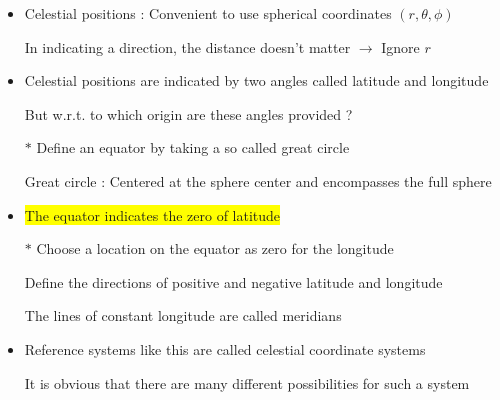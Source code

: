 \begin{itemize}
\item Celestial positions : Convenient to use spherical coordinates $(r,\theta,\phi)$
\item[] In indicating a direction, the distance doesn't matter $\rightarrow$ Ignore $r$
\item Celestial positions are indicated by two angles called {\blue latitude} and {\blue longitude}
\item[] But w.r.t. to which origin are these angles provided ?
\item[$\ast$] Define an {\blue equator} by taking a so called {\blue great circle}
\item[] Great circle : Centered at the sphere center and encompasses the full sphere
\item \colorbox{yellow}{The equator indicates the zero of latitude}
\item[$\ast$] {\blue Choose a location on the equator as zero for the longitude}
\item[] Define the directions of positive and negative latitude and longitude
\item[] The lines of constant longitude are called {\blue meridians}
\item Reference systems like this are called {\blue celestial coordinate systems}
\item[] It is obvious that there are many different possibilities for such a system 
\end{itemize}


